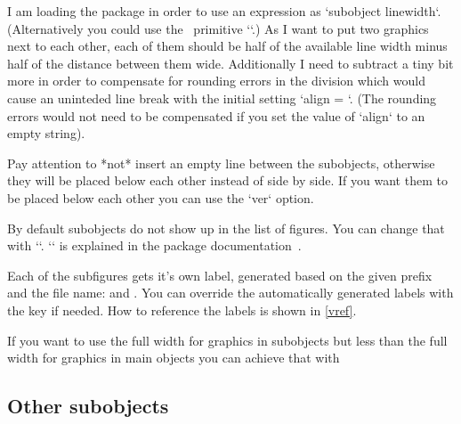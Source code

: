 I am loading the  package in order to use an expression as `subobject linewidth`.
(Alternatively you could use the \eTeX\ primitive `\dimexpr`.)
As I want to put two graphics next to each other, each of them should be half of the available line width minus half of the distance between them wide.
Additionally I need to subtract a tiny bit more in order to compensate for rounding errors in the division which would cause an uninteded line break with the initial setting `align = \centering`.
(The rounding errors would not need to be compensated if you set the value of `align` to an empty string).

Pay attention to *not* insert an empty line between the subobjects, otherwise they will be placed below each other instead of side by side.
If you want them to be placed below each other you can use the `ver` option.

By default subobjects do not show up in the list of figures.
You can change that with `\captionsetup[sub]{list=true}`.
`\captionsetup` is explained in the  package documentation~\autocite{caption}.


Each of the subfigures gets it's own label, generated based on the given prefix and the file name:  and .
You can override the automatically generated labels with the  key if needed.
How to reference the labels is shown in \cref{vref}.

If you want to use the full width for graphics in subobjects but less than the full width for graphics in main objects you can achieve that with
\begin{examplecode}
\end{examplecode}


\subsection{Other subobjects}
\label{subobjects-2}

